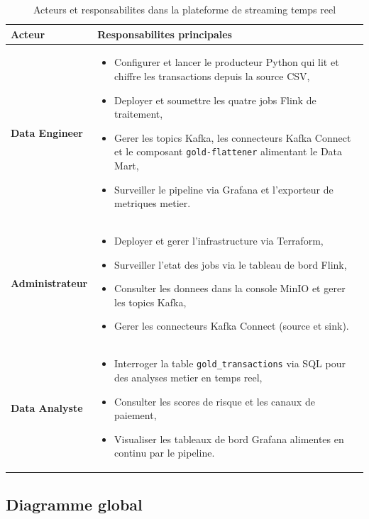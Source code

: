 \begin{table}[H]
\centering
\renewcommand{\arraystretch}{1.5}
\begin{tabular}{|l|p{11.5cm}|}
\hline
\textbf{Acteur} & \textbf{Responsabilites principales} \\
\hline
\textbf{Data Engineer} &
\begin{itemize}
    \item Configurer et lancer le producteur Python qui lit et chiffre les
    transactions depuis la source CSV,
    \item Deployer et soumettre les quatre jobs Flink de traitement,
    \item Gerer les topics Kafka, les connecteurs Kafka Connect et le composant
    \texttt{gold-flattener} alimentant le Data Mart,
    \item Surveiller le pipeline via Grafana et l'exporteur de metriques metier.
\end{itemize} \\
\hline
\textbf{Administrateur} &
\begin{itemize}
    \item Deployer et gerer l'infrastructure via Terraform,
    \item Surveiller l'etat des jobs via le tableau de bord Flink,
    \item Consulter les donnees dans la console MinIO et gerer les topics Kafka,
    \item Gerer les connecteurs Kafka Connect (source et sink).
\end{itemize} \\
\hline
\textbf{Data Analyste} &
\begin{itemize}
    \item Interroger la table \texttt{gold\_transactions} via SQL pour des analyses
    metier en temps reel,
    \item Consulter les scores de risque et les canaux de paiement,
    \item Visualiser les tableaux de bord Grafana alimentes en continu par le
    pipeline.
\end{itemize} \\
\hline
\end{tabular}
\caption{Acteurs et responsabilites dans la plateforme de streaming temps reel}
\label{tab:acteurs}
\end{table}

\subsection{Diagramme global}

